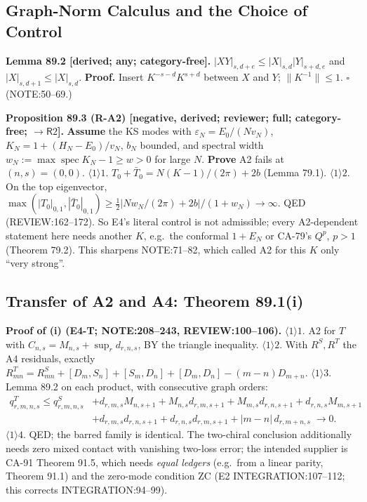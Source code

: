 \subsection{Graph-Norm Calculus and the Choice of Control}

\textbf{Lemma 89.2 [derived; any; category-free].}  \(|XY|_{s,d+e}\le|X|_{s,d}|Y|_{s+d,e}\) and
\(|X|_{s,d+1}\le|X|_{s,d}\).  \textbf{Proof.} Insert \(K^{-s-d}K^{s+d}\) between \(X\) and \(Y\); \(\|K^{-1}\|\le1\).
\(\square\) (NOTE:50--69.)

\textbf{Proposition 89.3 (R-A2) [negative, derived; reviewer; full; category-free; \(\to\mathsf R2\)].}
\textbf{Assume} the KS modes with \(\varepsilon_N=E_0/(Nv_N)\), \(K_N=1+(H_N-E_0)/v_N\), \(b_N\) bounded, and spectral
width \(w_N:=\max\operatorname{spec}K_N-1\ge w>0\) for large \(N\).  \textbf{Prove} A2 fails at \((n,s)=(0,0)\).
\(\langle1\rangle1\). \(T_0+\bar T_0=N(K-1)/(2\pi)+2b\) (Lemma 79.1).  \(\langle1\rangle2\). On the top eigenvector,
\(\max(|T_0|_{0,1},|\bar T_0|_{0,1})\ge\tfrac12|Nw_N/(2\pi)+2b|/(1+w_N)\to\infty\).  QED (REVIEW:162--172).
So E4's literal control is not admissible; every A2-dependent statement here needs another \(K\), e.g.\ the
conformal \(1+E_N\) or CA-79's \(Q^p\), \(p>1\) (Theorem 79.2).  This sharpens NOTE:71--82, which called A2 for this
\(K\) only ``very strong''.

\subsection{Transfer of A2 and A4: Theorem 89.1(i)}

\textbf{Proof of (i) (E4-T; NOTE:208--243, REVIEW:100--106).}  \(\langle1\rangle1\). A2 for \(T\) with
\(C_{n,s}=M_{n,s}+\sup_rd_{r,n,s}\), BY the triangle inequality.  \(\langle1\rangle2\). With \(R^S,R^T\) the A4
residuals, exactly \(R^T_{mn}=R^S_{mn}+[D_m,S_n]+[S_m,D_n]+[D_m,D_n]-(m-n)D_{m+n}\).  \(\langle1\rangle3\). Lemma
89.2 on each product, with consecutive graph orders:
\begin{equation}\label{eq:89-transfer}
\begin{split}
q^T_{r,m,n,s}\le q^S_{r,m,n,s}&+d_{r,m,s}M_{n,s+1}+M_{n,s}d_{r,m,s+1}+M_{m,s}d_{r,n,s+1}+d_{r,n,s}M_{m,s+1}\\
&+d_{r,m,s}d_{r,n,s+1}+d_{r,n,s}d_{r,m,s+1}+|m-n|\,d_{r,m+n,s}\;\longrightarrow0.
\end{split}
\end{equation}
\(\langle1\rangle4\). QED; the barred family is identical.  The two-chiral conclusion additionally needs zero
mixed contact with vanishing two-loss error; the intended supplier is CA-91 Theorem 91.5, which needs \emph{equal ledgers}
(e.g.\ from a linear parity, Theorem 91.1) and the zero-mode condition ZC (E2 INTEGRATION:107--112; this corrects INTEGRATION:94--99).

